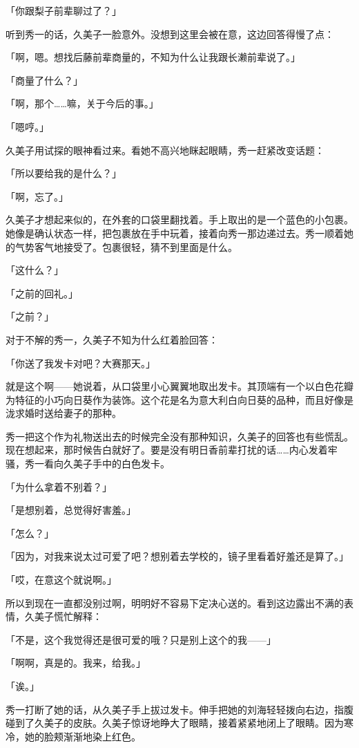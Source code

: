 \documentclass[UTF8]{ctexart}
\begin{document}
    「你跟梨子前辈聊过了？」

    听到秀一的话，久美子一脸意外。没想到这里会被在意，这边回答得慢了点：

    「啊，嗯。想找后藤前辈商量的，不知为什么让我跟长濑前辈说了。」

    「商量了什么？」

    「啊，那个……嘛，关于今后的事。」

    「嗯哼。」

    久美子用试探的眼神看过来。看她不高兴地眯起眼睛，秀一赶紧改变话题：

    「所以要给我的是什么？」

    「啊，忘了。」

    久美子才想起来似的，在外套的口袋里翻找着。手上取出的是一个蓝色的小包裹。她像是确认状态一样，把包裹放在手中玩着，接着向秀一那边递过去。秀一顺着她的气势客气地接受了。包裹很轻，猜不到里面是什么。

    「这什么？」

    「之前的回礼。」

    「之前？」

    对于不解的秀一，久美子不知为什么红着脸回答：

    「你送了我发卡对吧？大赛那天。」

    就是这个啊——她说着，从口袋里小心翼翼地取出发卡。其顶端有一个以白色花瓣为特征的小巧向日葵作为装饰。这个花是名为意大利白向日葵的品种，而且好像是泷求婚时送给妻子的那种。

    秀一把这个作为礼物送出去的时候完全没有那种知识，久美子的回答也有些慌乱。现在想起来，那时候告白就好了。要是没有明日香前辈打扰的话……内心发着牢骚，秀一看向久美子手中的白色发卡。

    「为什么拿着不别着？」

    「是想别着，总觉得好害羞。」

    「怎么？」

    「因为，对我来说太过可爱了吧？想别着去学校的，镜子里看着好羞还是算了。」

    「哎，在意这个就说啊。」

    所以到现在一直都没别过啊，明明好不容易下定决心送的。看到这边露出不满的表情，久美子慌忙解释：

    「不是，这个我觉得还是很可爱的哦？只是别上这个的我——」

    「啊啊，真是的。我来，给我。」

    「诶。」

    秀一打断了她的话，从久美子手上拔过发卡。伸手把她的刘海轻轻拨向右边，指腹碰到了久美子的皮肤。久美子惊讶地睁大了眼睛，接着紧紧地闭上了眼睛。因为寒冷，她的脸颊渐渐地染上红色。
\end{document}
